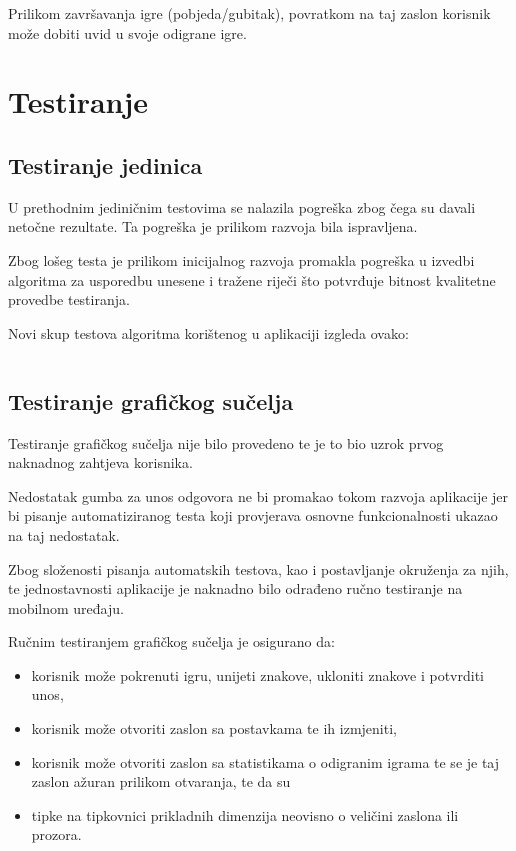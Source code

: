 \documentclass[12pt,a4paper]{report}
\begin{document}
Prilikom završavanja igre (pobjeda/gubitak), povratkom na taj zaslon korisnik
može dobiti uvid u svoje odigrane igre.

\chapter{Testiranje}

\section{Testiranje jedinica}
U prethodnim jediničnim testovima se nalazila pogreška zbog čega su davali
netočne rezultate. Ta pogreška je prilikom razvoja bila ispravljena.

Zbog lošeg testa je prilikom inicijalnog razvoja promakla pogreška u izvedbi
algoritma za usporedbu unesene i tražene riječi što potvrđuje bitnost kvalitetne
provedbe testiranja.

Novi skup testova algoritma korištenog u aplikaciji izgleda ovako:

\inputminted{cs}{../Wordel/Wordel.Tests/TextMatchingTest.cs}

\newpage
\section{Testiranje grafičkog sučelja}

Testiranje grafičkog sučelja nije bilo provedeno te je to bio uzrok prvog
naknadnog zahtjeva korisnika.

Nedostatak gumba za unos odgovora ne bi promakao tokom razvoja aplikacije jer bi
pisanje automatiziranog testa koji provjerava osnovne funkcionalnosti ukazao na
taj nedostatak.

Zbog složenosti pisanja automatskih testova, kao i postavljanje okruženja za
njih, te jednostavnosti aplikacije je naknadno bilo odrađeno ručno testiranje na
mobilnom uređaju.

Ručnim testiranjem grafičkog sučelja je osigurano da:
\begin{itemize}
    \item korisnik može pokrenuti igru, unijeti znakove, ukloniti znakove i
          potvrditi unos,
    \item korisnik može otvoriti zaslon sa postavkama te ih izmjeniti,
    \item korisnik može otvoriti zaslon sa statistikama o odigranim igrama te
          se je taj zaslon ažuran prilikom otvaranja, te da su
    \item tipke na tipkovnici prikladnih dimenzija neovisno o veličini
          zaslona ili prozora.
\end{itemize}
\end{document}
